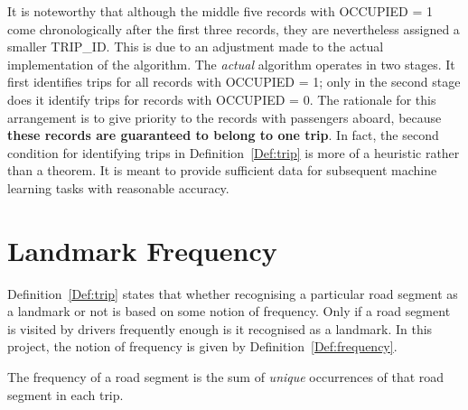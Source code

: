It is noteworthy that although the middle five records with OCCUPIED = 1 come chronologically after the first three records, they are nevertheless assigned a smaller TRIP\_ID. This is due to an adjustment made to the actual implementation of the algorithm. The \emph{actual} algorithm operates in two stages. It first identifies trips for all records with OCCUPIED = 1; only in the second stage does it identify trips for records with OCCUPIED = 0. The rationale for this arrangement is to give priority to the records with passengers aboard, because \textbf{these records are guaranteed to belong to one trip}. In fact, the second condition for identifying trips in Definition~\ref{Def:trip} is more of a heuristic rather than a theorem. It is meant to provide sufficient data for subsequent machine learning tasks with reasonable accuracy.

\section{Landmark Frequency}
Definition~\ref{Def:trip} states that whether recognising a particular road segment as a landmark or not is based on some notion of frequency. Only if a road segment is visited by drivers frequently enough is it recognised as a landmark. In this project, the notion of frequency is given by Definition~\ref{Def:frequency}.

\begin{defn}\label{Def:frequency}
The frequency of a road segment is the sum of \emph{unique} occurrences of that road segment in each trip. 
\end{defn}



